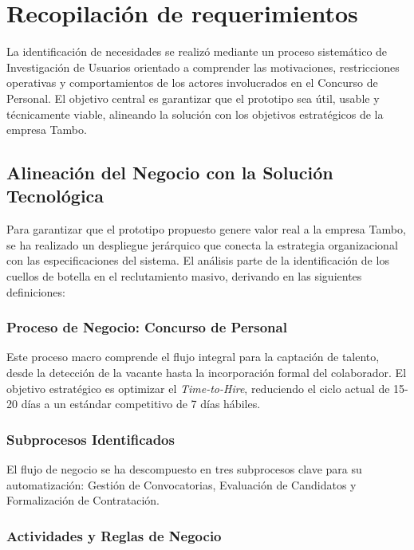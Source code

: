 \chapter{Recopilación de requerimientos}

La identificación de necesidades se realizó mediante un proceso sistemático de Investigación de Usuarios orientado a comprender las motivaciones, restricciones operativas y comportamientos de los actores involucrados en el Concurso de Personal. El objetivo central es garantizar que el prototipo sea útil, usable y técnicamente viable, alineando la solución con los objetivos estratégicos de la empresa Tambo.

\section{Alineación del Negocio con la Solución Tecnológica}

Para garantizar que el prototipo propuesto genere valor real a la empresa Tambo, se ha realizado un despliegue jerárquico que conecta la estrategia organizacional con las especificaciones del sistema. El análisis parte de la identificación de los cuellos de botella en el reclutamiento masivo, derivando en las siguientes definiciones:

\subsection{Proceso de Negocio: Concurso de Personal}

Este proceso macro comprende el flujo integral para la captación de talento, desde la detección de la vacante hasta la incorporación formal del colaborador. El objetivo estratégico es optimizar el \textit{Time-to-Hire}, reduciendo el ciclo actual de 15-20 días a un estándar competitivo de 7 días hábiles.

\subsection{Subprocesos Identificados}

El flujo de negocio se ha descompuesto en tres subprocesos clave para su automatización: Gestión de Convocatorias, Evaluación de Candidatos y Formalización de Contratación.

\subsection{Actividades y Reglas de Negocio}

